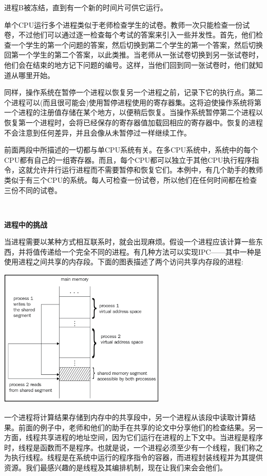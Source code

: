 进程B被冻结，直到有一个新的时间片可供它运行。 \par
单个CPU运行多个进程类似于老师检查学生的试卷。教师一次只能检查一份试卷，不过他们可以通过逐一检查每个考试的答案来引入一些并发性。首先，他们检查一个学生的第一个问题的答案，然后切换到第二个学生的第一个答案，然后切换回第一个学生的第二个答案，以此类推。当老师从一张试卷切换到另一张试卷时，他们会在结束的地方记下问题的编号。这样，当他们回到同一张试卷时，他们就知道从哪里开始。 \par
同样，操作系统在暂停一个进程以恢复另一个进程之前，记录下它的执行点。第二个进程可以(而且很可能会)使用暂停进程使用的寄存器集。这将迫使操作系统将第一个进程的注册值存储在某个地方，以便稍后恢复。当操作系统暂停第二个进程以恢复第一个进程时，会将已经保存的寄存器值加载回相应的寄存器中。恢复的进程不会注意到任何差异，并且会像从未暂停过一样继续工作。 \par
前面两段中所描述的一切都与单CPU系统有关。在多CPU系统中，系统中的每个CPU都有自己的一组寄存器。而且，每个CPU都可以独立于其他CPU执行程序指令，这就允许并行运行进程而不需要暂停和恢复它们。本例中，有几个助手的教师类似于有三个CPU的系统。每人可检查一份试卷，所以他们在任何时间都在检查三份不同的试卷。 \par

\noindent\textbf{}\ \par
\textbf{进程中的挑战} \ \par
当进程需要以某种方式相互联系时，就会出现麻烦。假设一个进程应该计算一些东西，并将值传递给一个完全不同的进程。有几种方法可以实现IPC——其中一种是使用进程之间共享的内存段。下面的图表描述了两个访问共享内存段的进程: \par

\begin{center}
	\includegraphics[width=0.6\textwidth]{content/Section-2/Chapter-8/8}
\end{center}

一个进程将计算结果存储到内存中的共享段中，另一个进程从该段中读取计算结果。前面的例子中，老师和他们的助手在共享的论文中分享他们的检查结果。另一方面，线程共享进程的地址空间，因为它们运行在进程的上下文中。当进程是程序时，线程是函数而不是程序。也就是说，一个进程必须至少有一个线程，我们称之为执行线程。线程是在系统中运行的程序指令的容器，而进程封装线程并为其提供资源。我们最感兴趣的是线程及其编排机制，现在让我们来会会他们。 \par

